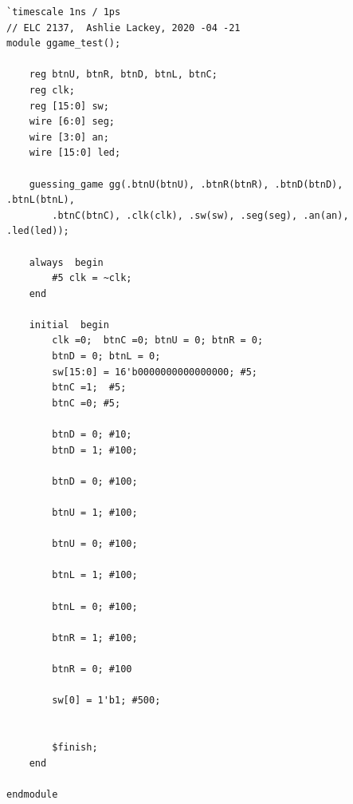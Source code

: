 \documentclass[11pt]{article}
\begin{document}
\begin{lstlisting}[style=Verilog,caption= guessing\_game testbench Verilog Code,label=code:ex ]
`timescale 1ns / 1ps
// ELC 2137,  Ashlie Lackey, 2020 -04 -21
module ggame_test();
	
	reg btnU, btnR, btnD, btnL, btnC;
	reg clk;
	reg [15:0] sw;
	wire [6:0] seg;
	wire [3:0] an;
	wire [15:0] led;
	
	guessing_game gg(.btnU(btnU), .btnR(btnR), .btnD(btnD), .btnL(btnL),
		.btnC(btnC), .clk(clk), .sw(sw), .seg(seg), .an(an), .led(led));
	
	always  begin
		#5 clk = ~clk;
	end
	
	initial  begin
		clk =0;  btnC =0; btnU = 0; btnR = 0;
		btnD = 0; btnL = 0; 
		sw[15:0] = 16'b0000000000000000; #5;
		btnC =1;  #5;
		btnC =0; #5;
		
		btnD = 0; #10;
		btnD = 1; #100;
		
		btnD = 0; #100;
		
		btnU = 1; #100;
		
		btnU = 0; #100;
		
		btnL = 1; #100;
		
		btnL = 0; #100;
		
		btnR = 1; #100;
		
		btnR = 0; #100
		
		sw[0] = 1'b1; #500;
		
		
		$finish;
	end

endmodule  
\end{lstlisting}
\end{document}
